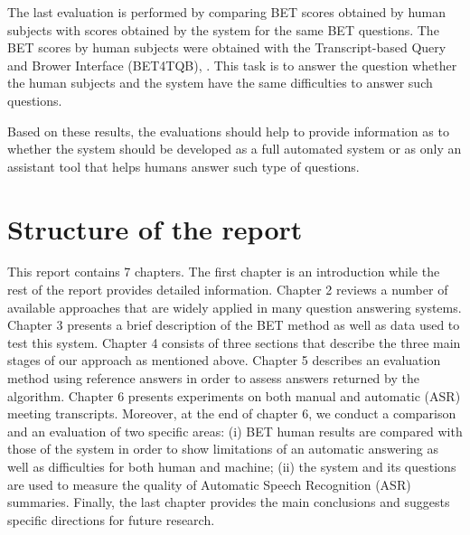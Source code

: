 The last evaluation is performed by comparing BET scores obtained by human subjects with scores obtained by the system for the same BET questions. The BET scores by human subjects were obtained with the Transcript-based Query and Brower Interface (BET4TQB)\cite{popescubelis2007otm}, . This task is to answer the question whether the human subjects and the system have the same difficulties to answer such questions.   

Based on these results, the evaluations should help to provide information as to whether the system should be developed as a full automated system or as only an assistant tool that helps humans answer such type of questions.

\section{Structure of the report}
This report contains 7 chapters. The first chapter is an introduction while the rest of the report provides detailed information. Chapter 2 reviews a number of available approaches that are widely applied in many question answering systems. Chapter 3 presents a brief description of the BET method as well as data used to test this system. Chapter 4 consists of three sections that describe the three main stages of our approach as mentioned above. Chapter 5 describes an evaluation method using reference answers in order to assess answers returned by the algorithm. Chapter 6 presents experiments on both manual and automatic (ASR) meeting transcripts. Moreover, at the end of chapter 6, we conduct a comparison and an evaluation of two specific areas: (i) BET human results are compared with those of the system in order to show limitations of an automatic answering as well as difficulties for both human and machine; (ii) the system and its questions are used to measure the quality of Automatic Speech Recognition (ASR) summaries. Finally, the last chapter provides the main conclusions and suggests specific directions for future research.
